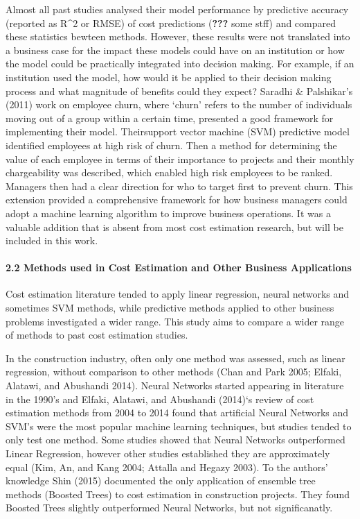 \documentclass[]{elsarticle} %
\begin{document}
Almost all past studies analysed their model performance by predictive
accuracy (reported as R\^{}2 or RMSE) of cost predictions
({\textbf{???}} some stff) and compared these statistics bewteen
methods. However, these results were not translated into a business case
for the impact these models could have on an institution or how the
model could be practically integrated into decision making. For example,
if an institution used the model, how would it be applied to their
decision making process and what magnitude of benefits could they
expect? Saradhi \& Palshikar's (2011) work on employee churn, where
`churn' refers to the number of individuals moving out of a group within
a certain time, presented a good framework for implementing their model.
Theirsupport vector machine (SVM) predictive model identified employees
at high risk of churn. Then a method for determining the value of each
employee in terms of their importance to projects and their monthly
chargeability was described, which enabled high risk employees to be
ranked. Managers then had a clear direction for who to target first to
prevent churn. This extension provided a comprehensive framework for how
business managers could adopt a machine learning algorithm to improve
business operations. It was a valuable addition that is absent from most
cost estimation research, but will be included in this work.

\paragraph{2.2 Methods used in Cost Estimation and Other Business
Applications}\label{methods-used-in-cost-estimation-and-other-business-applications}

Cost estimation literature tended to apply linear regression, neural
networks and sometimes SVM methods, while predictive methods applied to
other business problems investigated a wider range. This study aims to
compare a wider range of methods to past cost estimation studies.

In the construction industry, often only one method was assessed, such
as linear regression, without comparison to other methods (Chan and Park
2005; Elfaki, Alatawi, and Abushandi 2014). Neural Networks started
appearing in literature in the 1990's and Elfaki, Alatawi, and Abushandi
(2014)`s review of cost estimation methods from 2004 to 2014 found that
artificial Neural Networks and SVM's were the most popular machine
learning techniques, but studies tended to only test one method. Some
studies showed that Neural Networks outperformed Linear Regression,
however other studies established they are approximately equal (Kim, An,
and Kang 2004; Attalla and Hegazy 2003). To the authors' knowledge Shin
(2015) documented the only application of ensemble tree methods (Boosted
Trees) to cost estimation in construction projects. They found Boosted
Trees slightly outperformed Neural Networks, but not significanatly.
\end{document}
